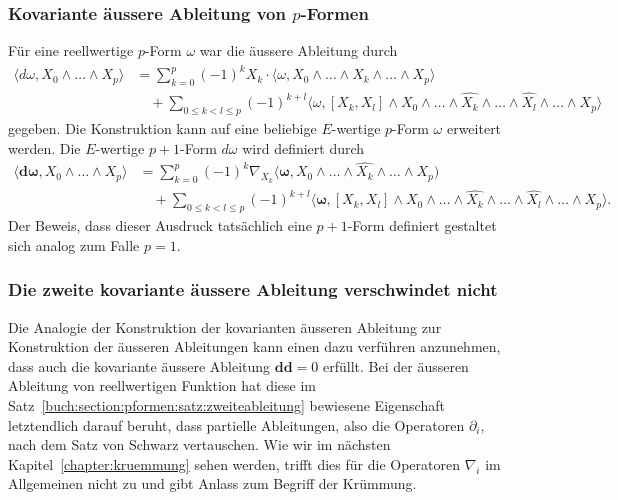 %
%
\subsubsection{Kovariante äussere Ableitung von $p$-Formen}
Für eine reellwertige $p$-Form $\omega$ war die äussere Ableitung
durch
\begin{align*}
\langle d\omega,X_0\wedge\dots\wedge X_p\rangle
&=
\sum_{k=0}^p
(-1)^k
X_k\cdot\langle \omega,X_0\wedge\dots\wedge \widehat{X_k}\wedge\dots\wedge X_p\rangle
\\
&\quad+
\sum_{0\le k<l\le p}
(-1)^{k+l}\langle\omega,
[X_k,X_l]\wedge X_0\wedge\dots\wedge\widehat{X_k}\wedge\dots\wedge\widehat{X_l}\wedge\dots\wedge X_p\rangle
\end{align*}
gegeben.
Die Konstruktion kann auf eine beliebige $E$-wertige $p$-Form $\omega$
erweitert werden.
Die $E$-wertige $p+1$-Form $d\omega$ wird definiert durch
\begin{align*}
\langle \boldsymbol{d}\boldsymbol{\omega}, X_0\wedge\dots\wedge X_{p}\rangle
&=
\sum_{k=0}^p
(-1)^k\nabla_{X_k}\langle\boldsymbol{\omega},X_0\wedge\dots\wedge\widehat{X_k}\wedge\dots\wedge X_p)
\\
&\quad+
\sum_{0\le k < l\le p}(-1)^{k+l}
\langle \boldsymbol{\omega},
[X_k,X_l]\wedge X_0\wedge\dots\wedge\widehat{X_k}\wedge\dots\wedge\widehat{X_l}\wedge\dots\wedge X_p\rangle.
\end{align*}
Der Beweis, dass dieser Ausdruck tatsächlich eine $p+1$-Form definiert
gestaltet sich analog zum Falle $p=1$.

%
%
\subsubsection{Die zweite kovariante äussere Ableitung verschwindet nicht}
Die Analogie der Konstruktion der kovarianten äusseren Ableitung
zur Konstruktion der äusseren Ableitungen kann einen dazu verführen
anzunehmen, dass auch die kovariante äussere Ableitung
$\boldsymbol{d} \boldsymbol{d}=0$ erfüllt.
Bei der äusseren Ableitung von reellwertigen Funktion hat diese
im Satz~\ref{buch:section:pformen:satz:zweiteableitung} bewiesene
Eigenschaft letztendlich darauf beruht, dass partielle Ableitungen,
also die Operatoren $\partial_i$, nach dem Satz von Schwarz vertauschen.
Wie wir im nächsten Kapitel~\ref{chapter:kruemmung} sehen werden, trifft
dies für die Operatoren $\nabla_i$ im Allgemeinen nicht zu und gibt
Anlass zum Begriff der Krümmung.



